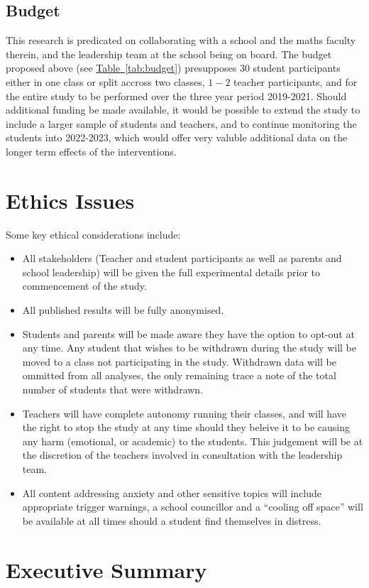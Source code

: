 \documentclass[14pt]{memoir}
\newcommand{\reftab}[1]{\hyperref[tab:#1]{Table~\ref{tab:#1}}}
\begin{document}
\subsection*{Budget}

This research is predicated on collaborating with a school and the maths faculty therein, and the leadership team at the school being on board. The budget proposed above (see \reftab{budget}) presupposes $30$ student participants either in one class or split accross two classes, $1-2$ teacher participants, and for the entire study to be performed over the three year period 2019-2021. Should additional funding be made available, it would be possible to extend the study to include a larger sample of students and teachers, and to continue monitoring the students into 2022-2023, which would offer very valuble additional data on the longer term effects of the interventions.



\section{Ethics Issues}

Some key ethical considerations include:
\begin{itemize}
	\item All stakeholders (Teacher and student participants as well as parents and school leadership) will be given the full experimental details prior to commencement of the study. 
	\item All published results will be fully anonymised.
	\item Students and parents will be made aware they have the option to opt-out at any time. Any student that wishes to be withdrawn during the study will be moved to a class not participating in the study. Withdrawn data will be ommitted from all analyses, the only remaining trace a note of the total number of students that were withdrawn.
	\item Teachers will have complete autonomy running their classes, and will have the right to stop the study at any time should they beleive it to be causing any harm (emotional, or academic) to the students. This judgement will be at the discretion of the teachers involved in consultation with the leadership team.
	\item All content addressing anxiety and other sensitive topics will include appropriate trigger warnings, a school councillor and a ``cooling off space'' will be available at all times should a student find themselves in distress.
\end{itemize}


\section{Executive Summary}



\printglossaries

\glsresetall

 
\end{document}
